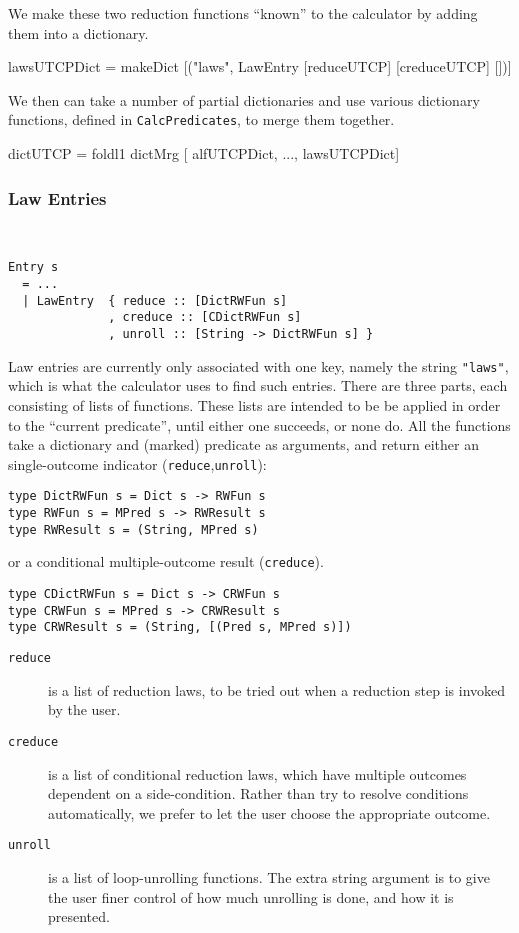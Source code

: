We make these two reduction functions ``known'' to the calculator
by adding them into a dictionary.
\begin{code}
lawsUTCPDict
 = makeDict [("laws", LawEntry [reduceUTCP] [creduceUTCP] [])]
\end{code}
We then can take a number of partial dictionaries and use various
dictionary functions,
defined in \texttt{CalcPredicates}, to merge them together.
\begin{code}
dictUTCP = foldl1 dictMrg [ alfUTCPDict, ..., lawsUTCPDict]
\end{code}

\subsubsection{Law Entries}~

\begin{verbatim}
Entry s
  = ...
  | LawEntry  { reduce :: [DictRWFun s]
              , creduce :: [CDictRWFun s]
              , unroll :: [String -> DictRWFun s] }
\end{verbatim}
Law entries are currently only associated with one key,
namely the string \texttt{"laws"},
which is what the calculator uses to find such entries.
There are three parts,
each consisting of lists of functions.
These lists are intended to be be applied in order to the
``current predicate'', until either one succeeds,
or none do.
All the functions take a dictionary
and (marked) predicate as arguments,
and return either
an single-outcome indicator (\texttt{reduce},\texttt{unroll}):
\begin{verbatim}
type DictRWFun s = Dict s -> RWFun s
type RWFun s = MPred s -> RWResult s
type RWResult s = (String, MPred s)
\end{verbatim}
or a conditional  multiple-outcome result (\texttt{creduce}).
\begin{verbatim}
type CDictRWFun s = Dict s -> CRWFun s
type CRWFun s = MPred s -> CRWResult s
type CRWResult s = (String, [(Pred s, MPred s)])
\end{verbatim}
\begin{description}
  \item[\texttt{reduce}]
     is a list of reduction laws,
     to be tried out when a reduction step is invoked by the user.
  \item[\texttt{creduce}]
    is a list of conditional reduction laws,
    which have multiple outcomes dependent on a side-condition.
    Rather than try to resolve conditions automatically,
    we prefer to let the user choose the appropriate outcome.
  \item[\texttt{unroll}]
    is a list of loop-unrolling functions.
    The extra string argument is to give the user finer control
    of how much unrolling is done, and how it is presented.
\end{description}
